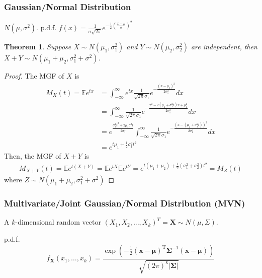 \documentclass[11pt,a4paper]{article}
\newtheorem{theorem}{Theorem}
\begin{document}
\subsubsection{Gaussian/Normal Distribution}
$N(\mu,\sigma^2)$. p.d.f. ${\displaystyle f(x)={\frac {1}{\sigma {\sqrt {2\pi }}}}e^{-{\frac {1}{2}}\left({\frac {x-\mu }{\sigma }}\right)^{2}}}$
\begin{theorem}
Suppose $X\sim N(\mu_1,\sigma_1^2)$ and $Y\sim N(\mu_2,\sigma_2^2)$ are independent, then $X+Y\sim N(\mu_1+\mu_2,\sigma_1^2+\sigma^2)$.
\end{theorem}
\begin{proof}
The MGF of $X$ is
\begin{equation}
    \begin{aligned}
        M_X(t)=\mathbb{E}e^{tx}&=\int_{-\infty}^{\infty}e^{tx}\frac{1}{\sqrt{2\pi}\sigma_1}e^{-\frac{(x-\mu_1)^2}{2\sigma_1^2}}dx\\
        &=\int_{-\infty}^{\infty}\frac{1}{\sqrt{2\pi}\sigma_1}e^{-\frac{x^2-2(\mu_1+\sigma_1^2t)x+\mu_1^2}{2\sigma_1^2}}dx\\
        &=e^{\frac{\sigma_1^4t^2+2\mu_1\sigma^2t}{2\sigma_1^2}}\int_{-\infty}^{\infty}\frac{1}{\sqrt{2\pi}\sigma_1}e^{-\frac{(x-(\mu_1+\sigma_1^2t))^2}{2\sigma_1^2}}dx\\
        &=e^{t\mu_1+\frac{1}{2}\sigma_1^2t^2}
    \end{aligned}
    \nonumber
\end{equation}
Then, the MGF of $X+Y$ is
\begin{equation}
    \begin{aligned}
        M_{X+Y}(t)=\mathbb{E}e^{t(X+Y)}=\mathbb{E}e^{tX}\mathbb{E}e^{tY}=e^{t(\mu_1+\mu_2)+\frac{1}{2}(\sigma_1^2+\sigma_2^2)t^2}=M_{Z}(t)
    \end{aligned}
    \nonumber
\end{equation}
where $Z\sim N(\mu_1+\mu_2,\sigma_1^2+\sigma^2)$
\end{proof}

\subsubsection{Multivariate/Joint Gaussian/Normal Distribution (MVN)}
A $k$-dimensional random vector $(X_1,X_2,...,X_k)^T=\mathbf{X}\sim N(\mu,\Sigma)$.

p.d.f. $${\displaystyle f_{\mathbf {X} }(x_{1},\ldots ,x_{k})={\frac {\exp \left(-{\frac {1}{2}}({\mathbf {x} }-{\boldsymbol {\mu }})^{\mathrm {T} }{\boldsymbol {\Sigma }}^{-1}({\mathbf {x} }-{\boldsymbol {\mu }})\right)}{\sqrt {(2\pi )^{k}|{\boldsymbol {\Sigma }}|}}}}$$
\end{document}
